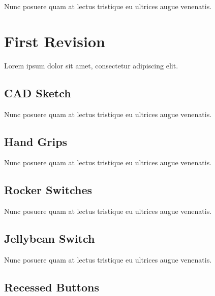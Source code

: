 Nunc posuere quam at lectus tristique eu ultrices augue venenatis.



\section{First Revision}

Lorem ipsum dolor sit amet, consectetur adipiscing elit.

\subsection{CAD Sketch}

Nunc posuere quam at lectus tristique eu ultrices augue venenatis.

\subsection{Hand Grips}

Nunc posuere quam at lectus tristique eu ultrices augue venenatis.

\subsection{Rocker Switches}

Nunc posuere quam at lectus tristique eu ultrices augue venenatis.

\subsection{Jellybean Switch}

Nunc posuere quam at lectus tristique eu ultrices augue venenatis.

\subsection{Recessed Buttons}

